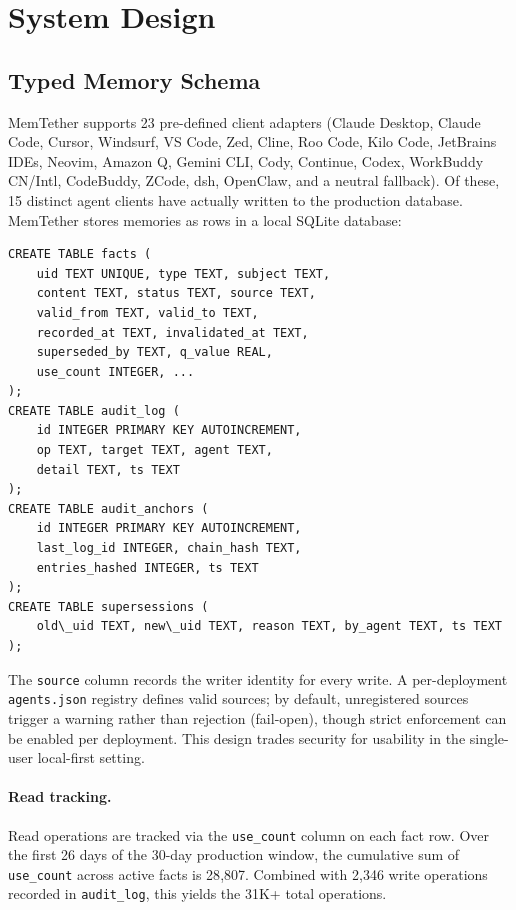 \documentclass[11pt]{article}
\begin{document}
\section{System Design}
\label{sec:design}

\subsection{Typed Memory Schema}
MemTether supports 23 pre-defined client adapters (Claude Desktop, Claude Code, Cursor, Windsurf, VS Code, Zed, Cline, Roo Code, Kilo Code, JetBrains IDEs, Neovim, Amazon Q, Gemini CLI, Cody, Continue, Codex, WorkBuddy CN/Intl, CodeBuddy, ZCode, dsh, OpenClaw, and a neutral fallback). Of these, 15 distinct agent clients have actually written to the production database. MemTether stores memories as rows in a local SQLite database:

\begin{verbatim}
CREATE TABLE facts (
    uid TEXT UNIQUE, type TEXT, subject TEXT,
    content TEXT, status TEXT, source TEXT,
    valid_from TEXT, valid_to TEXT,
    recorded_at TEXT, invalidated_at TEXT,
    superseded_by TEXT, q_value REAL,
    use_count INTEGER, ...
);
CREATE TABLE audit_log (
    id INTEGER PRIMARY KEY AUTOINCREMENT,
    op TEXT, target TEXT, agent TEXT,
    detail TEXT, ts TEXT
);
CREATE TABLE audit_anchors (
    id INTEGER PRIMARY KEY AUTOINCREMENT,
    last_log_id INTEGER, chain_hash TEXT,
    entries_hashed INTEGER, ts TEXT
);
CREATE TABLE supersessions (
    old\_uid TEXT, new\_uid TEXT, reason TEXT, by_agent TEXT, ts TEXT
);
\end{verbatim}

The \texttt{source} column records the writer identity for every write. A per-deployment \texttt{agents.json} registry defines valid sources; by default, unregistered sources trigger a warning rather than rejection (fail-open), though strict enforcement can be enabled per deployment. This design trades security for usability in the single-user local-first setting.

\paragraph{Read tracking.}
Read operations are tracked via the \texttt{use\_count} column on each fact row. Over the first 26 days of the 30-day production window, the cumulative sum of \texttt{use\_count} across active facts is 28{,}807. Combined with 2{,}346 write operations recorded in \texttt{audit\_log}, this yields the 31K+ total operations.
\end{document}
